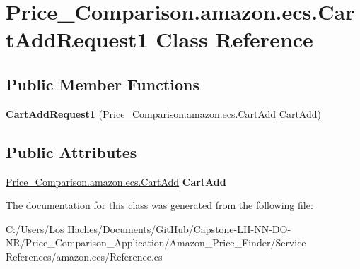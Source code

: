 \hypertarget{class_price___comparison_1_1amazon_1_1ecs_1_1_cart_add_request1}{\section{Price\-\_\-\-Comparison.\-amazon.\-ecs.\-Cart\-Add\-Request1 Class Reference}
\label{class_price___comparison_1_1amazon_1_1ecs_1_1_cart_add_request1}
}
\subsection*{Public Member Functions}
\begin{DoxyCompactItemize}
\item 
\hypertarget{class_price___comparison_1_1amazon_1_1ecs_1_1_cart_add_request1_a93b6ca4352365c24c3ade0ce1316b7f2}{{\bfseries Cart\-Add\-Request1} (\hyperlink{class_price___comparison_1_1amazon_1_1ecs_1_1_cart_add}{Price\-\_\-\-Comparison.\-amazon.\-ecs.\-Cart\-Add} \hyperlink{class_price___comparison_1_1amazon_1_1ecs_1_1_cart_add}{Cart\-Add})}\label{class_price___comparison_1_1amazon_1_1ecs_1_1_cart_add_request1_a93b6ca4352365c24c3ade0ce1316b7f2}

\end{DoxyCompactItemize}
\subsection*{Public Attributes}
\begin{DoxyCompactItemize}
\item 
\hypertarget{class_price___comparison_1_1amazon_1_1ecs_1_1_cart_add_request1_a74821fc64458c5e8d6c5082b01f6ae32}{\hyperlink{class_price___comparison_1_1amazon_1_1ecs_1_1_cart_add}{Price\-\_\-\-Comparison.\-amazon.\-ecs.\-Cart\-Add} {\bfseries Cart\-Add}}\label{class_price___comparison_1_1amazon_1_1ecs_1_1_cart_add_request1_a74821fc64458c5e8d6c5082b01f6ae32}

\end{DoxyCompactItemize}


The documentation for this class was generated from the following file\-:\begin{DoxyCompactItemize}
\item 
C\-:/\-Users/\-Los Haches/\-Documents/\-Git\-Hub/\-Capstone-\/\-L\-H-\/\-N\-N-\/\-D\-O-\/\-N\-R/\-Price\-\_\-\-Comparison\-\_\-\-Application/\-Amazon\-\_\-\-Price\-\_\-\-Finder/\-Service References/amazon.\-ecs/Reference.\-cs\end{DoxyCompactItemize}
